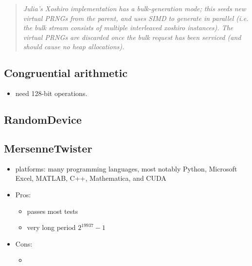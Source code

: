 \documentclass{article}
\begin{document}
            \begin{quote}
                \textit{Julia's Xoshiro implementation has a bulk-generation mode; this seeds new virtual PRNGs from the parent, and uses SIMD to generate in parallel (i.e. the bulk stream consists of multiple interleaved xoshiro instances). The virtual PRNGs are discarded once the bulk request has been serviced (and should cause no heap allocations).}
            \end{quote}

        \subsection*{Congruential arithmetic}

            \begin{itemize}
                \item need 128-bit operations.
            \end{itemize}

        \subsection*{RandomDevice}
        
        \subsection*{MersenneTwister}

            \begin{itemize}
                \item platforms: many programming languages, most notably Python\cite{Python}, Microsoft Excel\cite{Excel}, MATLAB\cite{MATLAB}, C++\cite{Cpp}, Mathematica\cite{Mathematica}, and CUDA\cite{CUDA}
                \item Pros:
                \begin{itemize}
                    \item passes most tests\cite{TestU01}
                    \item very long period $2^{19937} - 1$
                \end{itemize}
                \item Cons:
                    \begin{itemize}
                        \item 
                    \end{itemize}
            \end{itemize}
\end{document}
